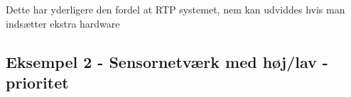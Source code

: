 Dette har yderligere den fordel at RTP systemet, nem kan udviddes hvis man indsætter ekstra hardware


\subsection{Eksempel 2 - Sensornetværk med høj/lav -prioritet}
